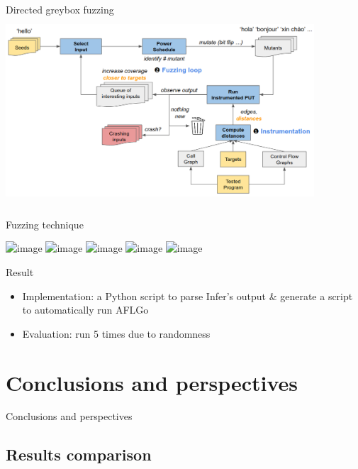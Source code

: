 \documentclass{beamer}
\begin{document}
\begin{frame}{Directed greybox fuzzing}
\includegraphics[width=11.5cm,height=7cm]{Figures/Fuzzing/graph3.png}

\end{frame}

\begin{frame}{Fuzzing technique}

\includegraphics<1>[scale=0.3]{Figures/Fuzzing/1.png}
\includegraphics<2>[scale=0.3]{Figures/Fuzzing/2.png}
\includegraphics<3>[scale=0.3]{Figures/Fuzzing/3.png}
\includegraphics<4>[scale=0.3]{Figures/Fuzzing/4.png}
\includegraphics<5>[scale=0.3]{Figures/Fuzzing/5.png}

\end{frame}

\begin{frame}{Result}
\begin{itemize}
	\item Implementation: a Python script to parse Infer's output \& generate a script to automatically run AFLGo
	\item Evaluation: run 5 times due to randomness
\end{itemize}

\end{frame}


\section{Conclusions and perspectives}

\begin{frame}
\centering
\LARGE Conclusions and perspectives
\end{frame}

\subsection{Results comparison}
\end{document}
